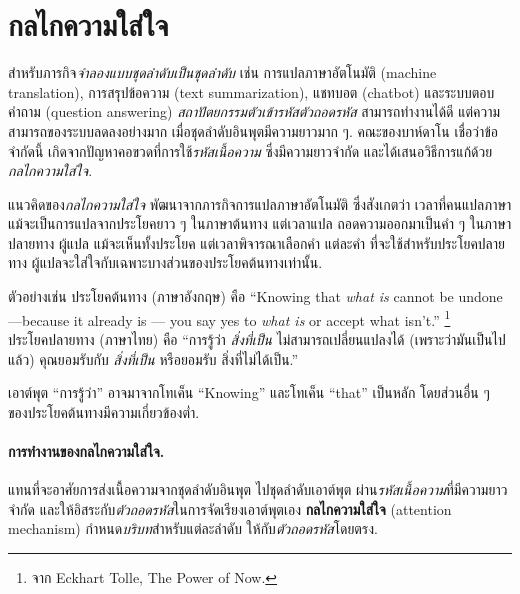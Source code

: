 \section{กลไกความใส่ใจ}
\label{sec:attention mechanism} 

สำหรับภารกิจ\textit{จำลองแบบชุดลำดับเป็นชุดลำดับ}
เช่น การแปลภาษาอัตโนมัติ (machine translation), 
การสรุปข้อความ (text summarization),
แชทบอต (chatbot)
และระบบตอบคำถาม (question answering)
\textit{สถาปัตยกรรมตัวเข้ารหัสตัวถอดรหัส}
สามารถทำงานได้ดี 
แต่ความสามารถของระบบลดลงอย่างมาก เมื่อชุดลำดับอินพุตมีความยาวมาก ๆ.
คณะของบาห์ดาโน\cite{BahdanauEtAl2015}
เชื่อว่าข้อจำกัดนี้ เกิดจากปัญหาคอขวดที่การใช้\textit{รหัสเนื้อความ} ซึ่งมีความยาวจำกัด
และได้เสนอวิธีการแก้ด้วย\textit{กลไกความใส่ใจ}.

แนวคิดของ\textit{กลไกความใส่ใจ} พัฒนาจากภารกิจการแปลภาษาอัตโนมัติ
ซึ่งสังเกตว่า เวลาที่คนแปลภาษา แม้จะเป็นการแปลจากประโยคยาว ๆ ในภาษาต้นทาง
แต่เวลาแปล ถอดความออกมาเป็นคำ ๆ ในภาษาปลายทาง
ผู้แปล แม้จะเห็นทั้งประโยค แต่เวลาพิจารณาเลือกคำ แต่ละคำ ที่จะใช้สำหรับประโยคปลายทาง
ผู้แปลจะใส่ใจกับเฉพาะบางส่วนของประโยคต้นทางเท่านั้น.

ตัวอย่างเช่น
ประโยคต้นทาง (ภาษาอังกฤษ) คือ
``Knowing that \textit{what is} cannot be undone---because it already is --- you say yes to \textit{what is} or accept what isn't.''%
\footnote{จาก Eckhart Tolle, The Power of Now.}
%
\\
ประโยคปลายทาง (ภาษาไทย) คือ
``การรู้ว่า \textit{สิ่งที่เป็น} ไม่สามารถเปลี่ยนแปลงได้ (เพราะว่ามันเป็นไปแล้ว)
คุณยอมรับกับ \textit{สิ่งที่เป็น} หรือยอมรับ สิ่งที่ไม่ได้เป็น.''

เอาต์พุต ``การรู้ว่า'' อาจมาจากโทเค็น ``Knowing'' และโทเค็น ``that'' เป็นหลัก
โดยส่วนอื่น ๆ ของประโยคต้นทางมีความเกี่ยวข้องต่ำ.



\paragraph{การทำงานของกลไกความใส่ใจ.}
แทนที่จะอาศัยการส่งเนื้อความจากชุดลำดับอินพุต ไปชุดลำดับเอาต์พุต ผ่าน\textit{รหัสเนื้อความ}ที่มีความยาวจำกัด
และให้อิสระกับ\textit{ตัวถอดรหัส}ในการจัดเรียงเอาต์พุตเอง
\textbf{กลไกความใส่ใจ} (attention mechanism)
กำหนด\textit{บริบท}สำหรับแต่ละลำดับ ให้กับ\textit{ตัวถอดรหัส}โดยตรง.

